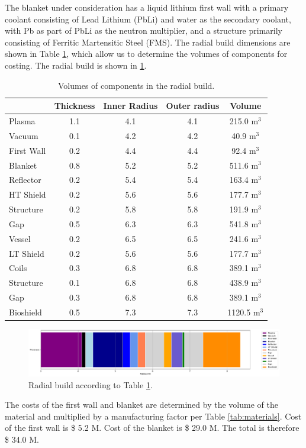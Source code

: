 The blanket under consideration has a liquid lithium first wall with a primary coolant consisting of Lead Lithium (PbLi) and water as the secondary coolant, with Pb as part of PbLi as the neutron multiplier, and a structure primarily consisting of Ferritic Martensitic Steel (FMS). The radial build dimensions are shown in Table \ref{tab:volumes}, which allow us to determine the volumes of components for costing.  The radial build is shown in \ref{fig:radial}.  \\


\begin{table}[h!]
    \centering
    \begin{tabular}{l c  c c c}
    \hline
        &	Thickness	&	Inner Radius	&	Outer radius	&	Volume		\\
        \hline
Plasma	&	1.1	&	4.1	&	4.1	&	215.0	m$^{3}$	\\
Vacuum	&	0.1	&	4.2	&	4.2	&	40.9	m$^{3}$	\\
First Wall	&	0.2	&	4.4	&	4.4	&	92.4	m$^{3}$	\\
Blanket	&	0.8	&	5.2	&	5.2	&	511.6	m$^{3}$	\\
Reflector	&	0.2	&	5.4	&	5.4	&	163.4	m$^{3}$	\\
HT Shield	&	0.2	&	5.6	&	5.6	&	177.7	m$^{3}$	\\
Structure	&	0.2	&	5.8	&	5.8	&	191.9	m$^{3}$	\\
Gap	&	0.5	&	6.3	&	6.3	&	541.8	m$^{3}$	\\
Vessel	&	0.2	&	6.5	&	6.5	&	241.6	m$^{3}$	\\
LT Shield	&	0.2	&	5.6	&	5.6	&	177.7	m$^{3}$	\\
Coils	&	0.3	&	6.8	&	6.8	&	389.1	m$^{3}$	\\
Structure	&	0.1	&	6.8	&	6.8	&	438.9	m$^{3}$	\\
Gap	&	0.3	&	6.8	&	6.8	&	389.1	m$^{3}$	\\
Bioshield	&	0.5	&	7.3	&	7.3	&	1120.5	m$^{3}$	\\

        \hline
    \end{tabular}
    \caption{Volumes of components in the radial build.}
    \label{tab:volumes}
\end{table}

\begin{figure}
    \centering
    \includegraphics[width=0.9\linewidth]{Figures/radial_build.pdf}
    \caption{Radial build according to Table \ref{tab:volumes}.}
    \label{fig:radial}
\end{figure}



The costs of the first wall and blanket are determined by the volume of the material and multiplied by a manufacturing factor per Table \ref{tab:materials}.   Cost of the first wall is \$ 5.2 M.  Cost of the blanket is \$ 29.0 M. The total is therefore \$ 34.0 M.

